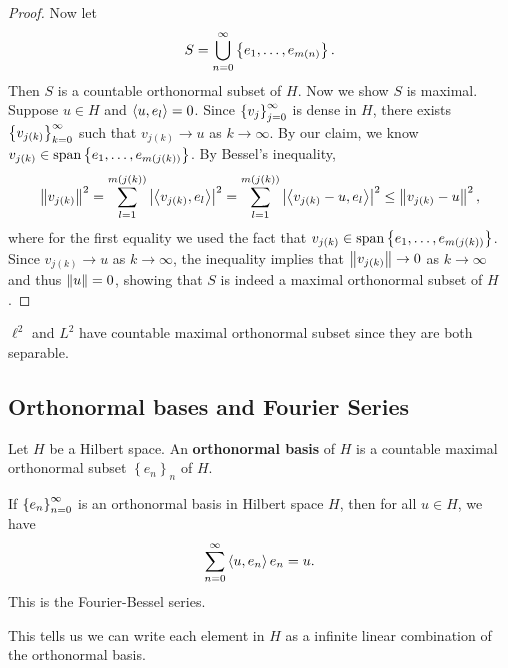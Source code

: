 \documentclass[a4paper]{article}
\begin{document}
\begin{proof}
Now let 
\[
S = \bigcup_{n=0}^\infty \left\{ e_1, \dots, e_{m(n)} \right\}.
\]
Then $S$ is a countable orthonormal subset of $H$.
Now we show $S$ is maximal. Suppose $u \in H$ and 
$\left\langle u, e_l \right\rangle = 0$. Since $\left\{ v_j \right\}_{j=0}^\infty$ is dense in 
$H$, there exists $\left\{ v_{j(k)} \right\}_{k=0}^\infty$ such that 
$v_{j(k)} \to u$ as $k \to \infty$. 
By our claim, we know 
$v_{j(k)} \in \operatorname{span} \left\{ e_1, \dots, e_{m(j(k))} \right\}$.
By Bessel's inequality, 
\[
\begin{aligned}
\left\lVert v_{j(k)}\right\rVert^2 
= \sum_{l=1}^{m(j(k))} \left\lvert \left\langle v_{j(k)}, e_l \right\rangle\right\rvert^2 
= \sum_{l=1}^{m(j(k))} \left\lvert \left\langle v_{j(k)} - u, e_l \right\rangle\right\rvert^2 
\leq \left\lVert v_{j(k)} - u\right\rVert^2,
\end{aligned}
\]
where for the first equality we used the fact that 
$v_{j(k)} \in \operatorname{span} \left\{ e_1, \dots, e_{m(j(k))} \right\}$.
Since $v_{j(k)} \to u$ as $k \to \infty$, 
the inequality implies that
$\left\lVert v_{j(k)}\right\rVert \to 0$ as $k \to \infty$ 
and thus $\left\lVert u\right\rVert = 0$, showing that 
$S$ is indeed a maximal orthonormal subset 
of $H$.
\end{proof}

\begin{cor}
$\ell^2$ and $L^2$ have countable maximal orthonormal
subset since they are both separable.
\end{cor}

\subsection{Orthonormal bases and Fourier Series}

\begin{defi}
Let $H$ be a Hilbert space. An \textbf{orthonormal basis}
of $H$ is a countable maximal orthonormal subset 
$\left\{ e_n \right\}_n$ of $H$.
\end{defi}

\begin{thm}
If $\left\{ e_n \right\}_{n=0}^\infty$ is an orthonormal basis in 
Hilbert space $H$, then for all $u \in H$, we have 
\[
\sum_{n=0}^\infty \left\langle u, e_n \right\rangle e_n = u.
\]
This is the Fourier-Bessel series.

This tells us we can write each element in $H$ as a 
infinite linear combination of the orthonormal basis.
\end{thm}
\end{document}
